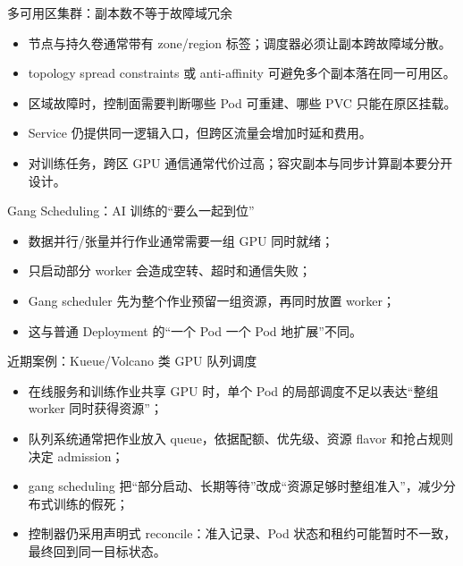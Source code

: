 \documentclass[UTF8,fontset=none,aspectratio=169,10pt]{beamer}
\begin{document}
\begin{frame}{多可用区集群：副本数不等于故障域冗余}
\begin{itemize}
  \item 节点与持久卷通常带有 zone/region 标签；调度器必须让副本跨故障域分散。
  \item topology spread constraints 或 anti-affinity 可避免多个副本落在同一可用区。
  \item 区域故障时，控制面需要判断哪些 Pod 可重建、哪些 PVC 只能在原区挂载。
  \item Service 仍提供同一逻辑入口，但跨区流量会增加时延和费用。
  \item 对训练任务，跨区 GPU 通信通常代价过高；容灾副本与同步计算副本要分开设计。
\end{itemize}
\vfill
{}
\end{frame}

\begin{frame}{Gang Scheduling：AI 训练的“要么一起到位”}
\begin{itemize}
  \item 数据并行/张量并行作业通常需要一组 GPU 同时就绪；
  \item 只启动部分 worker 会造成空转、超时和通信失败；
  \item Gang scheduler 先为整个作业预留一组资源，再同时放置 worker；
  \item 这与普通 Deployment 的“一个 Pod 一个 Pod 地扩展”不同。
\end{itemize}
\vfill
{}
\end{frame}

\begin{frame}{近期案例：Kueue/Volcano 类 GPU 队列调度}
\begin{itemize}
  \item 在线服务和训练作业共享 GPU 时，单个 Pod 的局部调度不足以表达“整组 worker 同时获得资源”；
  \item 队列系统通常把作业放入 queue，依据配额、优先级、资源 flavor 和抢占规则决定 admission；
  \item gang scheduling 把“部分启动、长期等待”改成“资源足够时整组准入”，减少分布式训练的假死；
  \item 控制器仍采用声明式 reconcile：准入记录、Pod 状态和租约可能暂时不一致，最终回到同一目标状态。
\end{itemize}
\vfill
{}
\end{frame}
\end{document}
